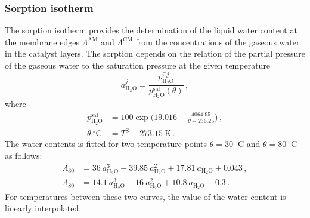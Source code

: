 \documentclass[pdftex,a4paper, 12pt]{article}
\begin{document}
\subsubsection*{Sorption isotherm}
%
%
The sorption isotherm provides the determination of the liquid water content at the membrane edges $\mathit{\Lambda}^{\mathrm{AM}}$ and $\mathit{\Lambda}^{\mathrm{CM}}$ from the concentrations of the gaseous water in the catalyst layers. The sorption depends on the relation of the partial pressure of the gaseous water to the saturation pressure at the given temperature
%
\begin{equation}
	a_{\mathrm{H_2O}}^{j} = \frac{p_{\mathrm{H_2O}}^{\mathrm{C}j}}{p_{\mathrm{H_2O}}^{\mathrm{sat}}(\theta)} \, ,
\end{equation}
%
where
%
\begin{align}
	p_{\mathrm{H_2O}}^{\mathrm{sat}} &= 100 \exp{\Big( 19.016 - \frac{4064.95}{\theta + 236.25} \Big)} \, , \\
	\theta ~^{\circ} \mathrm{C} &= T^{\mathrm{S}} - 273.15 ~\mathrm{K} \, .
\end{align}
%
The water contents is fitted for two temperature points $\theta = 30 ~^{\circ} \mathrm{C}$ and $\theta = 80 ~^{\circ} \mathrm{C}$ as follows:
%
\begin{align}
	\mathit{\Lambda}_{30} &= 36 ~a_{\mathrm{H_2O}}^3 - 39.85 ~a_{\mathrm{H_2O}}^2 + 17.81 ~a_{\mathrm{H_2O}} + 0.043 \, , \\
	\mathit{\Lambda}_{80} &= 14.1 ~a_{\mathrm{H_2O}}^3 - 16 ~a_{\mathrm{H_2O}}^2 + 10.8 ~a_{\mathrm{H_2O}} + 0.3 \, .
\end{align}
%
For temperatures between these two curves, the value of the water content is linearly interpolated.
%
%
\end{document}

